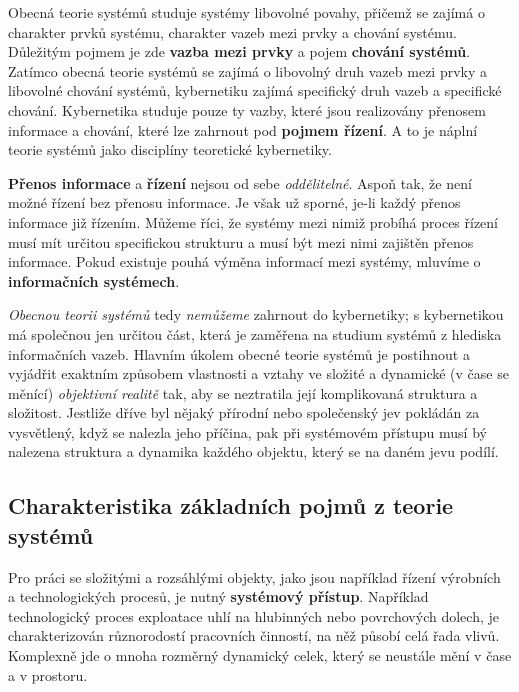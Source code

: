      Obecná teorie systémů studuje systémy libovolné povahy, přičemž se zajímá o charakter prvků 
     systému, charakter vazeb mezi prvky a chování systému. Důležitým pojmem je zde \textbf{vazba 
     mezi prvky} a pojem \textbf{chování systémů}. Zatímco obecná teorie systémů se zajímá o 
     libovolný druh vazeb mezi prvky a libovolné chování systémů, kybernetiku zajímá specifický 
     druh vazeb a specifické chování. Kybernetika studuje pouze ty vazby, které jsou realizovány 
     přenosem informace a chování, které lze zahrnout pod \textbf{pojmem řízení}. A to je náplní 
     teorie systémů jako disciplíny teoretické kybernetiky.
     
     \textbf{Přenos informace} a \textbf{řízení} nejsou od sebe \emph{oddělitelné}. Aspoň tak, že 
     není možné řízení bez přenosu informace. Je však už sporné, je-li každý přenos informace již 
     řízením. Můžeme říci, že systémy mezi nimiž probíhá proces řízení musí mít určitou specifickou 
     strukturu a musí být mezi nimi zajištěn přenos informace. Pokud existuje pouhá výměna 
     informací mezi systémy, mluvíme o \textbf{informačních systémech}.
     
     \emph{Obecnou teorii systémů} tedy \emph{nemůžeme} zahrnout do kybernetiky; s kybernetikou má 
     společnou jen určitou část, která je zaměřena na studium systémů z hlediska informačních 
     vazeb. Hlavním úkolem obecné teorie systémů je postihnout a vyjádřit exaktním způsobem 
     vlastnosti a vztahy ve složité a dynamické (v čase se měnící) \emph{objektivní realitě} tak, 
     aby se neztratila její komplikovaná struktura a složitost. Jestliže dříve byl nějaký přírodní 
     nebo společenský jev pokládán za vysvětlený, když se nalezla jeho příčina, pak při systémovém 
     přístupu musí bý nalezena struktura a dynamika každého objektu, který se na daném jevu podílí.
     
     \subsection{Charakteristika základních pojmů z teorie systémů}
       Pro práci se složitými a rozsáhlými objekty, jako jsou například řízení výrobních a
       technologických procesů, je nutný \textbf{systémový přístup}. Například technologický proces
       exploatace uhlí na hlubinných nebo povrchových dolech, je charakterizován různorodostí
       pracovních činností, na něž působí celá řada vlivů. Komplexně jde o mnoha rozměrný
       dynamický celek, který se neustále mění v čase a v prostoru.
       

